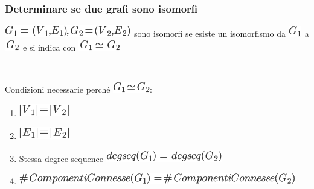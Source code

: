 \documentclass{article}
\providecommand{\tightlist}{%
  \setlength{\itemsep}{0pt}\setlength{\parskip}{0pt}}
\begin{document}
{}

\hypertarget{h.umjijdswjd6a}{\subsubsection{\texorpdfstring{{Determinare
se due grafi sono
isomorfi}}{Determinare se due grafi sono isomorfi}}\label{h.umjijdswjd6a}}

{}

\includegraphics{images/image426.png}{~s}{ono isomorfi se esiste un
isomorfismo da
}\includegraphics{images/image430.png}{~}{a}\includegraphics{images/image431.png}{~}{e
si indica con }\includegraphics{images/image432.png}

{~~~~~~~~}

{Condizioni necessarie perché }\includegraphics{images/image433.png}{:}

\begin{enumerate}
\tightlist
\item
  \includegraphics{images/image434.png}
\item
  \includegraphics{images/image435.png}
\item
  {Stessa degree sequence }\includegraphics{images/image436.png}
\item
  \includegraphics{images/image437.png}
\end{enumerate}

{}

{}
\end{document}
